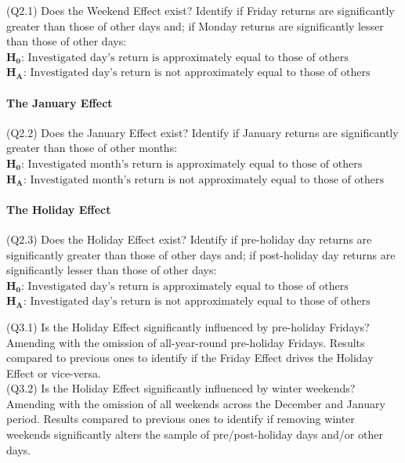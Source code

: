 \documentclass[11pt, english]{article}
\begin{document}
			(Q2.1) Does the Weekend Effect exist? Identify if Friday returns are significantly greater than those of other days and; if Monday returns are significantly lesser than those of other days:\\

			$\mathrm{\mathbf{H_0}\textbf{:}\textrm{ Investigated day’s return is approximately equal to those of others}}$\\ $\mathrm{\mathbf{H_A}\textbf{:}\textrm{ Investigated day’s return is not approximately equal to those of others}}$

			\paragraph{The January Effect}

			(Q2.2) Does the January Effect exist? Identify if January returns are significantly greater than those of other months:\\

			$\mathrm{\mathbf{H_0}\textbf{:}\textrm{ Investigated month’s return is approximately equal to those of others}}$\\ $\mathrm{\mathbf{H_A}\textbf{:}\textrm{ Investigated month’s return is not approximately equal to those of others}}$

			\paragraph{The Holiday Effect}

			(Q2.3) Does the Holiday Effect exist? Identify if pre-holiday day returns are significantly greater than those of other days and; if post-holiday day returns are significantly lesser than those of other days:\\

			$\mathrm{\mathbf{H_0}\textbf{:}\textrm{ Investigated day’s return is approximately equal to those of others}}$\\ $\mathrm{\mathbf{H_A}\textbf{:}\textrm{ Investigated day’s return is not approximately equal to those of others}}$

			\newpage

			(Q3.1) Is the Holiday Effect significantly influenced by pre-holiday Fridays? Amending with the omission of all-year-round pre-holiday Fridays. Results compared to previous ones to identify if the Friday Effect drives the Holiday Effect or vice-versa.\\

			(Q3.2) Is the Holiday Effect significantly influenced by winter weekends? Amending with the omission of all weekends across the December and January period. Results compared to previous ones to identify if removing winter weekends significantly alters the sample of pre/post-holiday days and/or other days.\\
\end{document}
